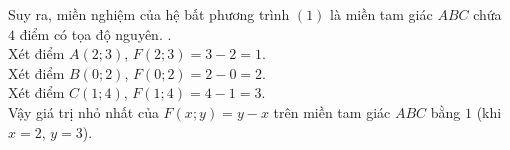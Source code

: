 \begin{ex}
{\begin{itemchoice}
\begin{center}
\end{center}
Suy ra, miền nghiệm của hệ bất phương trình $(1)$ là miền tam giác $ABC$ chứa $4$ điểm có tọa độ nguyên.
.\\
Xét điểm $A(2;3)$, $F(2;3)=3-2=1$.\\
Xét điểm $B(0;2)$, $F(0;2)=2-0=2$.\\
Xét điểm $C(1;4)$, $F(1;4)=4-1=3$.\\
Vậy giá trị nhỏ nhất của $F(x;y)=y-x$ trên miền tam giác $ABC$ bằng $1$ (khi $x=2$, $y=3$).
\end{itemchoice}}
\end{ex}

